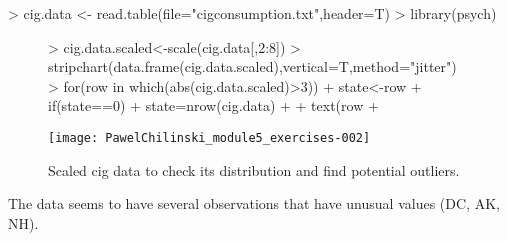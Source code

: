 \documentclass[a4paper]{article}
\begin{document}
\begin{Schunk}
\begin{Sinput}
> cig.data <- read.table(file="cigconsumption.txt",header=T)
> library(psych)
\end{Sinput}
\end{Schunk}
\begin{figure}[H]
\begin{center}
\begin{Schunk}
\begin{Sinput}
> cig.data.scaled<-scale(cig.data[,2:8])
> stripchart(data.frame(cig.data.scaled),vertical=T,method="jitter")
> for(row in which(abs(cig.data.scaled)>3)){
+ 	state<-row %% nrow(cig.data)
+ 	if(state==0){
+ 		state=nrow(cig.data)
+ 	}
+ 	text(row%/%nrow(cig.data)+1.3,cig.data.scaled[row],cig.data$State[state])
+ }
\end{Sinput}
\end{Schunk}
\texttt{[image: PawelChilinski\_module5\_exercises-002]}
\caption{Scaled cig data to check its distribution and find potential outliers.}
\end{center}
\end{figure}
The data seems to have several observations that have unusual values (DC,
AK, NH).
\end{document}
